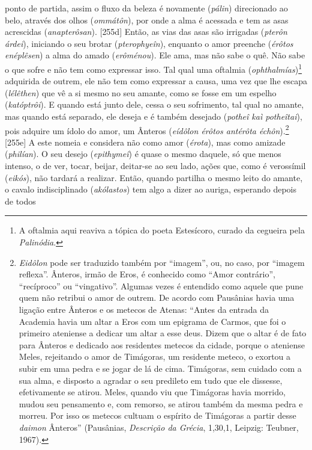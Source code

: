 ponto de partida, assim o fluxo da beleza é novamente (\emph{pálin})
direcionado ao belo, através dos olhos (\emph{ommátôn}), por onde a alma
é acessada e tem as asas acrescidas (\emph{anapterôsan}). {[}255d{]}
Então, as vias das asas são irrigadas (\emph{pterôn árdei}), iniciando o
seu brotar (\emph{pterophyeîn}), enquanto o amor preenche (\emph{érôtos
enéplêsen}) a alma do amado (\emph{erôménou}). Ele ama, mas não sabe o
quê. Não sabe o que sofre e não tem como expressar isso. Tal qual uma
oftalmia (\emph{ophthalmías})\footnote{A oftalmia aqui reaviva a tópica
  do poeta Estesícoro, curado da cegueira pela \emph{Palinódia}.}
adquirida de outrem, ele não tem como expressar a causa, uma vez que lhe
escapa (\emph{lélêthen}) que vê a si mesmo no seu amante, como se fosse
em um espelho (\emph{katóptrôi}). E quando está junto dele, cessa o seu
sofrimento, tal qual no amante, mas quando está separado, ele deseja e é
também desejado (\emph{potheî kaì potheîtai}), pois adquire um ídolo do
amor, um Ânteros (\emph{eídôlon érôtos antérôta échôn}).\footnote{\emph{Eidôlon}
  pode ser traduzido também por ``imagem'', ou, no caso, por ``imagem
  reflexa''. Ânteros, irmão de Eros, é conhecido como ``Amor
  contrário'', ``recíproco'' ou ``vingativo''. Algumas vezes é entendido
  como aquele que pune quem não retribui o amor de outrem. De acordo com
  Pausânias havia uma ligação entre Ânteros e os metecos de Atenas:
  ``Antes da entrada da Academia havia um altar a Eros com um epigrama
  de Carmos, que foi o primeiro ateniense a dedicar um altar a esse
  deus. Dizem que o altar é de fato para Ânteros e dedicado aos
  residentes metecos da cidade, porque o ateniense Meles, rejeitando o
  amor de Timágoras, um residente meteco, o exortou a subir em uma pedra
  e se jogar de lá de cima. Timágoras, sem cuidado com a sua alma, e
  disposto a agradar o seu predileto em tudo que ele dissesse,
  efetivamente se atirou. Meles, quando viu que Timágoras havia morrido,
  mudou seu pensamento e, com remorso, se atirou também da mesma pedra e
  morreu. Por isso os metecos cultuam o espírito de Timágoras a partir
  desse \emph{daimon} Ânteros'' (Pausânias, \emph{Descrição da Grécia},
  1,30,1, Leipzig: Teubner, 1967).} {[}255e{]} A este nomeia e considera
não como amor (\emph{érota}), mas como amizade (\emph{philían}). O seu
desejo (\emph{epithymeî}) é quase o mesmo daquele, só que menos intenso,
o de ver, tocar, beijar, deitar-se ao seu lado, ações que, como é
verossímil (\emph{eikós}), não tardará a realizar. Então, quando
partilha o mesmo leito do amante, o cavalo indisciplinado
(\emph{akólastos}) tem algo a dizer ao auriga, esperando depois de todos
